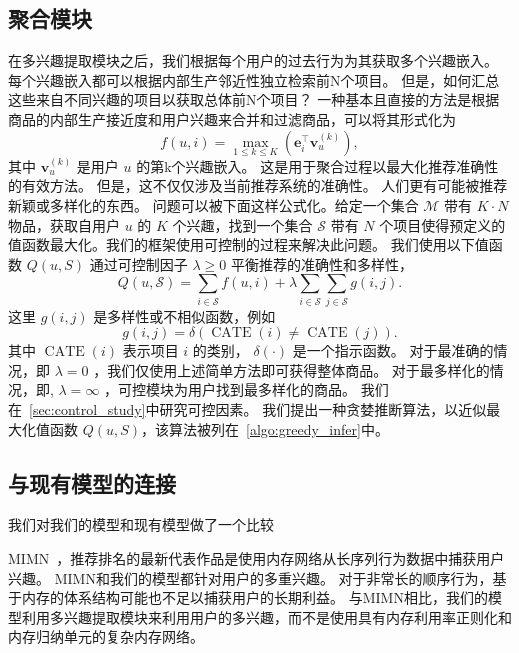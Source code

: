 \subsection{聚合模块}
在多兴趣提取模块之后，我们根据每个用户的过去行为为其获取多个兴趣嵌入。 每个兴趣嵌入都可以根据内部生产邻近性独立检索前N个项目。 但是，如何汇总这些来自不同兴趣的项目以获取总体前N个项目？ 一种基本且直接的方法是根据商品的内部生产接近度和用户兴趣来合并和过滤商品，可以将其形式化为
\begin{equation}
    f(u,i) = \max_{1\leq k\leq K}(\mathbf{e}_i^\top \mathbf{v}_u^{(k)}),
\end{equation}
其中 $\mathbf{v}_u^{(k)}$ 是用户 $u$ 的第k个兴趣嵌入。 这是用于聚合过程以最大化推荐准确性的有效方法。 但是，这不仅仅涉及当前推荐系统的准确性。 人们更有可能被推荐新颖或多样化的东西。
问题可以被下面这样公式化。给定一个集合 $\mathcal{M}$ 带有 $K\cdot N$ 物品，获取自用户 $u$ 的 $K$ 个兴趣，找到一个集合 $\mathcal{S}$ 带有 $N$ 个项目使得预定义的值函数最大化。我们的框架使用可控制的过程来解决此问题。 我们使用以下值函数 $Q(u,S)$ 通过可控制因子 $\lambda \geq 0$ 平衡推荐的准确性和多样性，
\begin{equation}
    Q(u,\mathcal{S}) = \sum_{i\in \mathcal{S}} f(u,i) + \lambda \sum_{i\in \mathcal{S}} \sum_{j\in \mathcal{S}} g(i,j).
\end{equation}
\noindent 这里 $g(i,j)$ 是多样性或不相似函数，例如
\begin{equation}
    g(i,j) = \delta(\operatorname{CATE}(i) \neq \operatorname{CATE}(j)).
\end{equation}
其中 $\operatorname{CATE}(i)$ 表示项目 $i$ 的类别， $\delta(\cdot)$ 是一个指示函数。
对于最准确的情况，即 $\lambda=0$ ，我们仅使用上述简单方法即可获得整体商品。 对于最多样化的情况，即, $\lambda=\infty$ ，可控模块为用户找到最多样化的商品。 我们在~\ref{sec:control_study}中研究可控因素。 我们提出一种贪婪推断算法，以近似最大化值函数 $Q(u,S)$，该算法被列在~\ref{algo:greedy_infer}中。


\subsection{与现有模型的连接}
我们对我们的模型和现有模型做了一个比较

MIMN~\cite{pi2019practice}，推荐排名的最新代表作品是使用内存网络从长序列行为数据中捕获用户兴趣。 MIMN和我们的模型都针对用户的多重兴趣。 对于非常长的顺序行为，基于内存的体系结构可能也不足以捕获用户的长期利益。 与MIMN相比，我们的模型利用多兴趣提取模块来利用用户的多兴趣，而不是使用具有内存利用率正则化和内存归纳单元的复杂内存网络。

